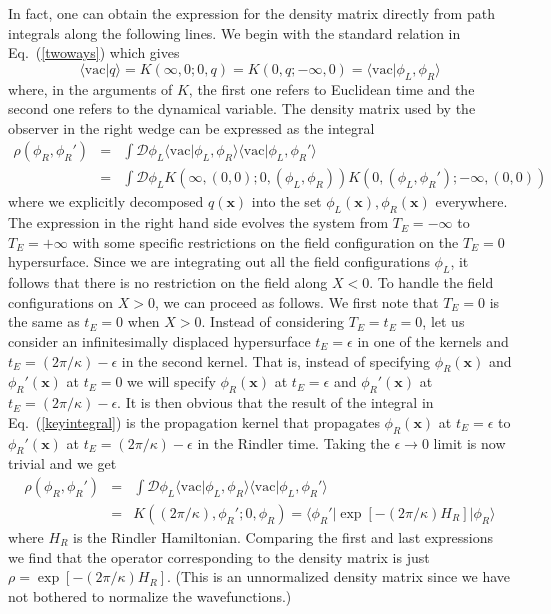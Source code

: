\documentclass[12pt]{iopart}
\def\eq#1{{Eq.~(\ref{#1})}}
\begin{document}
 In fact, one can  obtain the expression for the density matrix directly from path integrals along the following lines. We begin with the standard relation in \eq{twoways} which gives
 \begin{equation}
  \langle \mathrm{vac}\vert q \rangle  = K(\infty,0; 0,q) = K(0,q;-\infty,0)= 
  \langle \mathrm{vac}\vert \phi_L,\phi_R\rangle
 \end{equation} 
 where, in the arguments of $K$, the first one refers to Euclidean time and the second one refers to the dynamical variable.  The density matrix used by the observer in the right wedge can be expressed as the integral 
 \begin{eqnarray}
 \label{keyintegral}
  \rho (\phi_R, \phi_R') &=& \int \mathcal{D}\phi_L 
  \langle \mathrm{vac}\vert \phi_L,\phi_R\rangle \langle \mathrm{vac}\vert \phi_L,\phi_R'\rangle\\
  &=& \int \mathcal{D}\phi_L 
  K(\infty,(0,0); 0,(\phi_L,\phi_R))K(0,(\phi_L,\phi_R'); -\infty,(0,0))\nonumber
 \end{eqnarray} 
where we explicitly decomposed $q(\mathbf{x})$ into the set $\phi_L(\mathbf{x}), \phi_R(\mathbf{x})$ everywhere.
The expression in the right hand side evolves the system from $T_E = -\infty$ to
$T_E=+\infty$ with some specific restrictions on the field configuration on the $T_E=0$ hypersurface. Since we are integrating out all the field configurations $\phi_L$, it follows that there is no restriction on the field along $X<0$. To handle the field configurations on $X>0$, we can proceed as follows. We first note that $T_E=0$ is the same as $t_E=0$
when $X>0$. Instead of considering $T_E=t_E=0$, let us consider an infinitesimally displaced hypersurface $t_E=\epsilon$ in one of the kernels and $t_E=(2\pi/\kappa) -\epsilon$
in the second kernel. That is, instead of specifying $\phi_R(\mathbf{x})$
and $\phi_R'(\mathbf{x})$ at $t_E=0$ we will specify $\phi_R(\mathbf{x})$
at $t_E=\epsilon$ and $\phi_R'(\mathbf{x})$ at $t_E=(2\pi/\kappa) -\epsilon$. It is then obvious that the result of the integral in \eq{keyintegral} is the propagation kernel
that propagates $\phi_R(\mathbf{x})$ at $t_E=\epsilon$ to  $\phi_R'(\mathbf{x})$ at $t_E=(2\pi/\kappa) -\epsilon$  in the Rindler time. Taking the $\epsilon \to 0$ limit is now trivial and we get 
\begin{eqnarray}
\label{denmat}
  \rho (\phi_R, \phi_R') &=& \int \mathcal{D}\phi_L 
  \langle \mathrm{vac}\vert \phi_L,\phi_R\rangle \langle \mathrm{vac}\vert \phi_L,\phi_R'\rangle\\ 
 & =& K((2\pi/\kappa), \phi_R'; 0, \phi_R)
  = \langle \phi_R'|\exp[-(2\pi/\kappa)H_R] |\phi_R\rangle\nonumber
  \end{eqnarray}
  where $H_R$ is the Rindler  Hamiltonian.
  Comparing the first and last expressions we find that the operator corresponding to the density matrix is just $\rho = \exp[-(2\pi/\kappa)H_R]$. (This is an unnormalized
  density matrix since we have not bothered to normalize the wavefunctions.)
\end{document}
